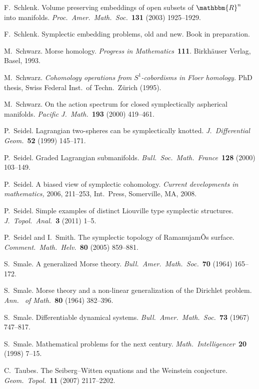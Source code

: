 \documentclass[12pt,twoside]{amsart}
\theoremstyle{plain}
\numberwithin{figure}{section}
\numberwithin{equation}{section}
\def\RR{\mathbbm{R}}
\begin{document}
\begin{thebibliography}{999}
F.\ Schlenk.
Volume preserving embeddings of open subsets of $\RR^n$ into manifolds. 
{\it Proc.\ Amer.\ Math.\ Soc.}~{\bf 131} (2003) 1925--1929. 

F.\ Schlenk.
Symplectic embedding problems, old and new.
Book in preparation.

M.\ Schwarz.
Morse homology. 
{\it Progress in Mathematics}~{\bf 111}. Birkh\"auser Verlag, Basel, 1993.

M.\ Schwarz.
{\it Cohomology operations from $S^1$-cobordisms in Floer homology.} 
PhD thesis, Swiss Federal Inst.\ of Techn.\ Z\"urich (1995).

M.\ Schwarz.
On the action spectrum for closed symplectically aspherical manifolds. 
{\it Pacific J.\ Math.}~{\bf 193} (2000) 419--461.

P.\ Seidel.
Lagrangian two-spheres can be symplectically knotted. 
{\it J.\ Differential Geom.}~{\bf 52} (1999) 145--171.

P.\ Seidel.
Graded Lagrangian submanifolds. 
{\it Bull.\ Soc.\ Math.\ France}~{\bf 128} (2000) 103--149. 

P.\ Seidel.
A biased view of symplectic cohomology. 
{\it Current developments in mathematics,} 2006, 211--253, Int.\ Press, Somerville, MA, 2008.

P.\ Seidel.
Simple examples of distinct Liouville type symplectic structures. 
{\it J.\ Topol.\ Anal.}~{\bf 3} (2011) 1--5.

P.\ Seidel and I.\ Smith. 
The symplectic topology of RamanujamÕs surface.
{\it Comment.\ Math.\ Helv.}~{\bf 80} (2005) 859--881.

S.\ Smale.
A generalized Morse theory.
{\it Bull.\ Amer.\ Math.\ Soc.}~{\bf 70} (1964) 165--172.

S.\ Smale.
Morse theory and a non-linear generalization of the Dirichlet problem.
{\it Ann.~ of Math.}~{\bf 80} (1964) 382--396.

S.\ Smale.
Differentiable dynamical systems. 
{\it Bull.\ Amer.\ Math.\ Soc.}~{\bf 73} (1967) 747--817.

S.\ Smale.
Mathematical problems for the next century. 
{\it Math.\ Intelligencer}~{\bf 20} (1998) 7--15.

C.\ Taubes.
The Seiberg--Witten equations and the Weinstein conjecture. 
{\it Geom.\ Topol.}~{\bf 11} (2007) 2117--2202.


\end{thebibliography}
\end{document}
